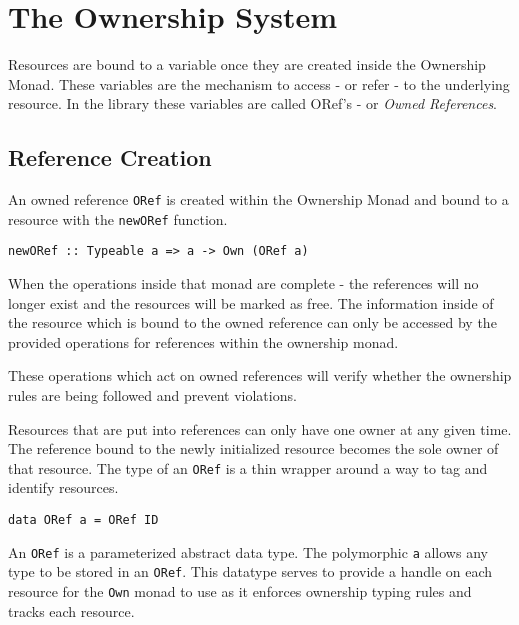 \documentclass[onehalf,11pt]{beavtex}
\begin{document}
\section{The Ownership System}

Resources are bound to a variable once they are created inside the Ownership
Monad.  These variables are the mechanism to access - or refer - to the
underlying resource.  In the library these variables are called ORef's -
or \textit{Owned References}.

\subsection{Reference Creation}

An owned reference \texttt{ORef} is created within the Ownership Monad and bound
to a resource with the \texttt{newORef} function.

\begin{verbatim}
newORef :: Typeable a => a -> Own (ORef a)
\end{verbatim}

When the operations inside that monad are complete - the references
will no longer exist and the resources will be marked as free.
The information inside of the resource which is bound to the owned reference can
only be accessed by the provided operations for references within the ownership
monad.

These operations which act on owned references will verify whether the ownership
rules are being followed and prevent violations.

Resources that are put into references can only have one owner at any given
time. The reference bound to the newly initialized resource becomes the sole
owner of that resource. 
The type of an \texttt{ORef} is a thin wrapper around a way to tag and identify
resources.

\begin{verbatim}
data ORef a = ORef ID
\end{verbatim}

An \texttt{ORef} is a parameterized abstract data type. The polymorphic
\texttt{a} allows any type to be stored in an \texttt{ORef}.
This datatype serves to provide a handle on each resource for the \texttt{Own}
monad to use as it enforces ownership typing rules and tracks each resource.
\end{document}

